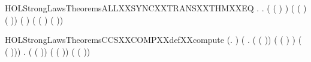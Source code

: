 \begin{SaveVerbatim}{HOLStrongLawsTheoremsALLXXSYNCXXTRANSXXTHMXXEQ}
\HOLTokenTurnstile{} \HOLSymConst{\HOLTokenForall{}}     .
            \HOLTokenTransBegin{}\HOLTokenTransEnd {} \HOLSymConst{\HOLTokenEquiv{}}
       \HOLSymConst{\HOLTokenExists{}}  .
            \HOLSymConst{\HOLTokenLeq{}}  \HOLSymConst{\HOLTokenConj{}}  \HOLSymConst{\HOLTokenLeq{}}  \HOLSymConst{\HOLTokenConj{}} ( ( ) \HOLSymConst{=}  ) \HOLSymConst{\HOLTokenConj{}}
           ( ( ) \HOLSymConst{=}  ( )) \HOLSymConst{\HOLTokenConj{}} ( \HOLSymConst{=} \HOLConst{\ensuremath{\tau}}) \HOLSymConst{\HOLTokenConj{}}
           ( \HOLSymConst{=}  ( ) \HOLSymConst{\ensuremath{\parallel}}  ( ))
\end{SaveVerbatim}
\newcommand{\HOLStrongLawsTheoremsALLXXSYNCXXTRANSXXTHMXXEQ}{\UseVerbatim{HOLStrongLawsTheoremsALLXXSYNCXXTRANSXXTHMXXEQ}}
\begin{SaveVerbatim}{HOLStrongLawsTheoremsCCSXXCOMPXXdefXXcompute}
\HOLTokenTurnstile{} (\HOLSymConst{\HOLTokenForall{}}.    \HOLSymConst{=}  ) \HOLSymConst{\HOLTokenConj{}}
   (\HOLSymConst{\HOLTokenForall{}} .
          ( ( )) \HOLSymConst{=}
          ( ( ) \HOLSymConst{-} ) \HOLSymConst{\ensuremath{\parallel}}  ( ( ))) \HOLSymConst{\HOLTokenConj{}}
   \HOLSymConst{\HOLTokenForall{}} .
         ( ( )) \HOLSymConst{=}
         ( ( )) \HOLSymConst{\ensuremath{\parallel}}  ( ( ))
\end{SaveVerbatim}
